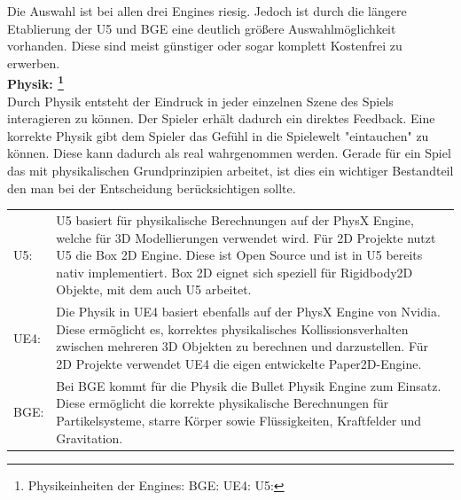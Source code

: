 Die Auswahl ist bei allen drei Engines riesig. Jedoch ist durch die längere Etablierung der \ac{U5} und \ac{BGE} eine deutlich größere Auswahlmöglichkeit vorhanden. Diese sind meist günstiger oder sogar komplett Kostenfrei zu erwerben.\\

\textbf{Physik: \footnote{Physikeinheiten der Engines:  BGE:\cite{timocc2012} \cite{blenderorg2015physics} UE4:\cite{epicgamesinc.2015physics}  U5:\cite{unitytechnologies2015physics}}}\\
Durch Physik entsteht der Eindruck in jeder einzelnen Szene des Spiels interagieren zu können. Der Spieler erhält dadurch ein direktes Feedback. Eine korrekte Physik gibt dem Spieler das Gefühl in die Spielewelt "eintauchen" zu können. Diese kann dadurch als real wahrgenommen werden. Gerade für ein Spiel das mit physikalischen Grundprinzipien arbeitet, ist dies ein wichtiger Bestandteil den man bei der Entscheidung berücksichtigen sollte. 
\begin{table}[H]
\centering
\begin{tabular}{lp{14.5cm}}

\ac{U5}: &
\ac{U5} basiert für physikalische Berechnungen auf der PhysX Engine, welche für 3D Modellierungen verwendet wird. Für 2D Projekte nutzt \ac{U5} die Box 2D Engine. Diese ist Open Source und ist in \ac{U5} bereits nativ implementiert. Box 2D eignet sich speziell für Rigidbody2D Objekte, mit dem auch \ac{U5} arbeitet.\\
\ac{UE4}:& Die Physik in \ac{UE4} basiert ebenfalls auf der PhysX Engine von Nvidia. Diese ermöglicht es, korrektes physikalisches Kollissionsverhalten zwischen mehreren 3D Objekten zu berechnen und darzustellen. Für 2D Projekte verwendet \ac{UE4} die eigen entwickelte Paper2D-Engine. \\

\ac{BGE}:&
Bei \ac{BGE} kommt für die Physik die Bullet Physik Engine zum Einsatz. Diese ermöglicht die korrekte physikalische Berechnungen für Partikelsysteme, starre Körper sowie Flüssigkeiten, Kraftfelder und Gravitation.
\end{tabular}
\end{table}


